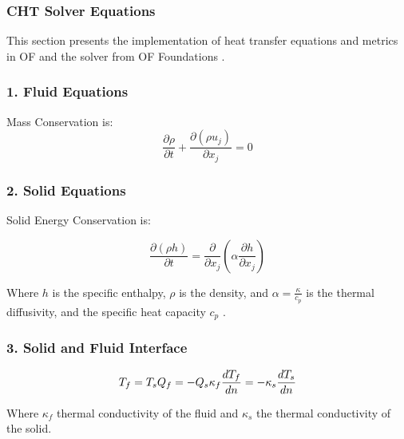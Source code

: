 \subsubsection{CHT Solver Equations}    

This section presents the implementation of heat transfer equations and metrics in \gls{OF} and the solver from \gls{OF} Foundations \cite{OpenFOAMFoundation}.
\subsubsection{1. Fluid Equations}

Mass Conservation is:
\begin{equation}
\frac{\partial \rho}{\partial t} + \frac{\partial (\rho u_j)}{\partial x_j} = 0
\end{equation}


     

\subsubsection{2. Solid Equations}
Solid Energy Conservation is:

\begin{equation}
\frac{\partial (\rho h)}{\partial t} = \frac{\partial}{\partial x_j}\left( \alpha \frac{\partial h}{\partial x_j} \right)
\end{equation}

Where \( h \) is the specific enthalpy, \( \rho \) is the density, and \( \alpha = \frac{\kappa}{c_p} \) is the thermal diffusivity, and the specific heat capacity \( c_p \) . 


\subsubsection{3. Solid and Fluid Interface}
\begin{equation}
T_f = T_s  \\
Q_f = -Q_s  \\
\kappa_f \frac{d T_f}{d n} = -\kappa_s \frac{d T_s}{d n} 
\end{equation}

Where \( \kappa_f \) thermal conductivity of the fluid and \( \kappa_s \)  the thermal conductivity of the solid.







